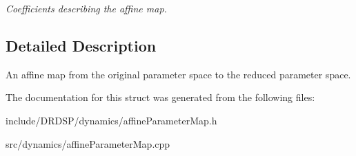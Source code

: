 \begin{DoxyCompactItemize}
\begin{DoxyCompactList}\small\item\em Coefficients describing the affine map. \end{DoxyCompactList}\end{DoxyCompactItemize}


\subsection{Detailed Description}
An affine map from the original parameter space to the reduced parameter space. 

The documentation for this struct was generated from the following files\-:\begin{DoxyCompactItemize}
\item 
include/\-D\-R\-D\-S\-P/dynamics/affine\-Parameter\-Map.\-h\item 
src/dynamics/affine\-Parameter\-Map.\-cpp\end{DoxyCompactItemize}
